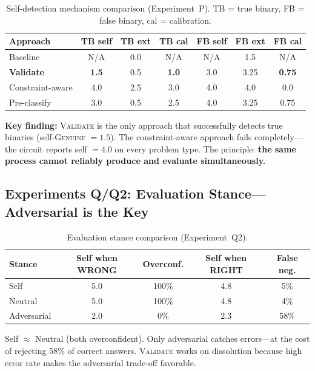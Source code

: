 \documentclass[11pt,a4paper]{article}
\begin{document}
\begin{table}[H]
\centering
\caption{Self-detection mechanism comparison (Experiment~P). TB = true binary, FB = false binary, cal = calibration.}
\small
\begin{tabular}{lcccccc}
\toprule
\textbf{Approach} & \textbf{TB self} & \textbf{TB ext} & \textbf{TB cal} & \textbf{FB self} & \textbf{FB ext} & \textbf{FB cal} \\
\midrule
Baseline          & N/A & 0.0 & N/A & N/A & 1.5  & N/A \\
\textbf{Validate} & \textbf{1.5} & 0.5 & \textbf{1.0} & 3.0 & 3.25 & \textbf{0.75} \\
Constraint-aware  & 4.0 & 2.5 & 3.0 & 4.0 & 4.0  & 0.0 \\
Pre-classify      & 3.0 & 0.5 & 2.5 & 4.0 & 3.25 & 0.75 \\
\bottomrule
\end{tabular}
\label{tab:validate}
\end{table}

\textbf{Key finding:} \textsc{Validate} is the only approach that successfully detects true binaries (self-\textsc{Genuine} $= 1.5$). The constraint-aware approach fails completely---the circuit reports self $= 4.0$ on every problem type. The principle: \textbf{the same process cannot reliably produce and evaluate simultaneously.}

\subsection{Experiments Q/Q2: Evaluation Stance---Adversarial is the Key}
\label{sec:eval-stance}

\begin{table}[H]
\centering
\caption{Evaluation stance comparison (Experiment~Q2).}
\begin{tabular}{lcccc}
\toprule
\textbf{Stance} & \textbf{Self when WRONG} & \textbf{Overconf.} & \textbf{Self when RIGHT} & \textbf{False neg.} \\
\midrule
Self        & 5.0 & 100\% & 4.8 & 5\% \\
Neutral     & 5.0 & 100\% & 4.8 & 4\% \\
Adversarial & 2.0 & 0\%   & 2.3 & 58\% \\
\bottomrule
\end{tabular}
\label{tab:eval-stance}
\end{table}

Self $\approx$ Neutral (both overconfident). Only adversarial catches errors---at the cost of rejecting 58\% of correct answers. \textsc{Validate} works on dissolution because high error rate makes the adversarial trade-off favorable.
\end{document}
